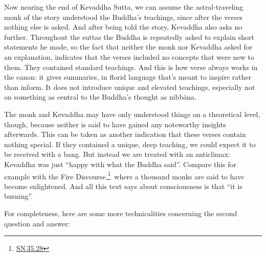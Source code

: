 \documentclass[10pt, openany]{book}
\begin{document}
Now nearing the end of Kevaddha Sutta, we can assume the astral-traveling monk of the story understood the Buddha’s teachings, since after the verses nothing else is asked. And after being told the story, Kevaddha also asks no further. Throughout the suttas the Buddha is repeatedly asked to explain short statements he made, so the fact that neither the monk nor Kevaddha asked for an explanation, indicates that the verses included no concepts that were new to them. They contained standard teachings. And this is how verse always works in the canon: it gives summaries, in florid language that’s meant to inspire rather than inform. It does not introduce unique and elevated teachings, especially not on something as central to the Buddha’s thought as nibbāna.


The monk and Kevaddha may have only understood things on a theoretical level, though, because neither is said to have gained any noteworthy insights afterwards. This can be taken as another indication that these verses contain nothing special. If they contained a unique, deep teaching, we could expect it to be received with a bang. But instead we are treated with an anticlimax: Kevaddha was just “happy with what the Buddha said”. Compare this for example with the Fire Discourse,\footnote {\href{https://suttacentral.net/sn35.28/en/sujato}{SN 35.28}} where a thousand monks are said to have become enlightened. And all this text says about consciousness is that “it is burning”.


For completeness, here are some more technicalities concerning the second question and answer:
\end{document}
